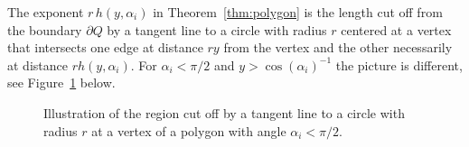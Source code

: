 \documentclass{article}
\begin{document}
The exponent $r \, h(y,\alpha_i)$ in Theorem~\ref{thm:polygon} is the length cut off from the boundary $\partial Q$ by a tangent line to a circle with radius $r$ centered at a vertex that intersects one edge at distance $ry$ from the vertex and the other necessarily at distance $r h(y,\alpha_i)$. For $\alpha_i < \pi/2$ and $y > \cos(\alpha_i)^{-1}$ the picture is different, see Figure~\ref{fig:small-alpha} below.

\begin{figure}[h]
    \centering
    \caption{Illustration of the region cut off by a tangent line to a circle with radius $r$ at a vertex of a polygon with angle $\alpha_i < \pi/2$.}
    \label{fig:small-alpha}
\end{figure}
\end{document}
